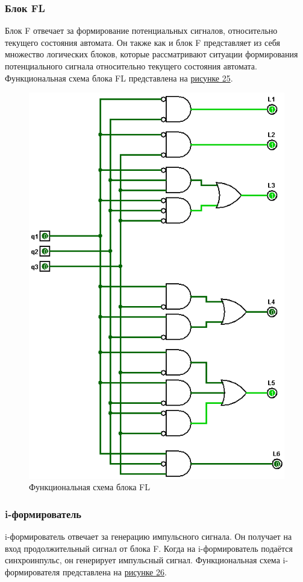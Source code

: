 \documentclass[11pt,a4paper,final]{article} %
\begin{document}
\subsubsection{Блок FL}
Блок F отвечает за формирование потенциальных сигналов, относительно текущего состояния автомата. Он также как и блок F представляет из себя множество логических блоков, которые рассматривают ситуации формирования потенциального сигнала относительно текущего состояния автомата. Функциональная схема блока FL представлена на \hyperref[fig:FL]{рисунке 25}.

\begin{figure}[H]
	\centering
	\includegraphics[width=0.75 \linewidth]{img/FL.png}
	\caption{Функциональная схема блока FL}
	\label{fig:FL}
\end{figure}

\subsubsection{i-формирователь}
\label{sec:i}

i-формирователь отвечает за генерацию импульсного сигнала. Он получает на вход продолжительный сигнал от блока F. Когда на i-формирователь подаётся синхроинпульс, он генерирует импульсный сигнал. Функциональная схема i-формирователя представлена на \hyperref[fig:icov]{рисунке 26}.
\end{document}
